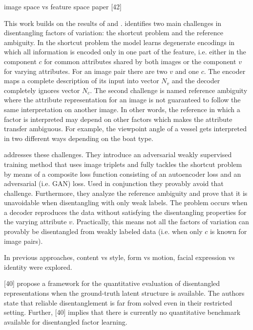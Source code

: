 \documentclass[11pt,a4paper]{article}
\begin{document}
\par image space vs feature space paper [42]

This work builds on the results of \cite{1711.07410} and \cite{1711.02245}.
\cite{1711.02245} identifies two main challenges in disentangling factors of variation: the shortcut problem and the reference ambiguity. In the shortcut problem the model learns degenerate encodings in which all information is encoded only in one part of the feature, i.e. either in the component $c$ for common attributes shared by both images or the component $v$ for varying attributes. For an image pair there are two $v$ and one $c$. The encoder maps a complete description of its input into vector $N_v$ and the decoder completely ignores vector $N_c$.
\newline The second challenge is named reference ambiguity where the attribute representation for an image is not guaranteed to follow the same interpretation on another image. In other words, the reference in which a factor is interpreted may depend on other factors which makes the attribute transfer ambiguous. For example, the viewpoint angle of a vessel gets interpreted in two different ways depending on the boat type.
\par[Understanding Degeneracies and Ambiguities in Attribute Transfer] addresses these challenges. They introduce an adversarial weakly supervised training method that uses image triplets and fully tackles the shortcut problem by means of a composite loss function consisting of an autoencoder loss and an adversarial (i.e. GAN) loss. Used in conjunction they provably avoid that challenge. 
Furthermore, they analyze the reference ambiguity and prove that it is unavoidable when disentangling with only weak labels. The problem occurs when a decoder reproduces the data without satisfying the disentangling properties for the varying attribute $v$. Practically, this means not all the factors of variation can provably be disentangled from weakly labeled data (i.e. when only $c$ is known for image pairs).    

In previous approaches, content vs style, form vs motion, facial expression vs identity were explored.

[40] propose a framework for the quantitative evaluation of disentangled representations when the ground-truth latent structure is available. The authors state that reliable disentanglement is far from solved even in their restricted setting. Further, [40] implies that there is currently no quantitative benchmark available for disentangled factor learning.
\end{document}
